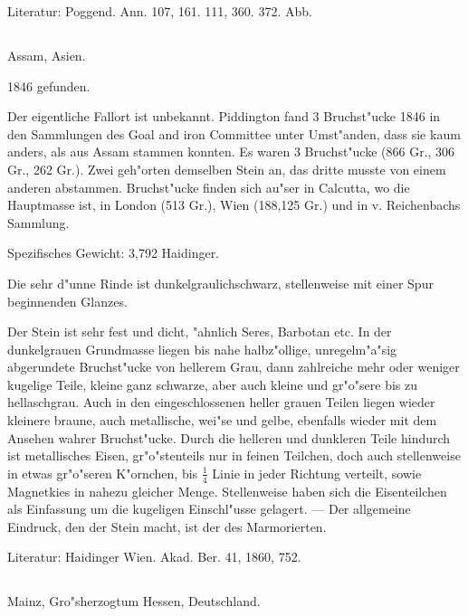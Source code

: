 \documentclass[a4paper, 11pt, oneside]{article}
\begin{document}
\normalsize
Literatur: Poggend. Ann. 107, 161. 111, 360. 372. Abb.

\subsection{}
\LARGE
\paragraph{}
Assam, Asien.

1846 gefunden.

Der eigentliche Fallort ist unbekannt. Piddington fand 3 Bruchst"ucke 1846 in den Sammlungen des Goal and iron Committee unter Umst"anden, dass sie kaum anders, als aus Assam stammen konnten. Es waren 3 Bruchst"ucke (866 Gr., 306 Gr., 262 Gr.). Zwei geh"orten demselben Stein an, das dritte musste von einem anderen abstammen. Bruchst"ucke finden sich au"ser in Calcutta, wo die Hauptmasse ist, in London (513 Gr.), Wien (188,125 Gr.) und in v. Reichenbachs Sammlung.

Spezifisches Gewicht: 3,792 Haidinger.

Die sehr d"unne Rinde ist dunkelgraulichschwarz, stellenweise mit einer Spur beginnenden Glanzes.

Der Stein ist sehr fest und dicht, "ahnlich Seres, Barbotan etc. In der dunkelgrauen Grundmasse liegen bis nahe halbz"ollige, unregelm"a"sig abgerundete Bruchst"ucke von hellerem Grau, dann zahlreiche mehr oder weniger kugelige Teile, kleine ganz schwarze, aber auch kleine und gr"o"sere bis zu hellaschgrau. Auch in den eingeschlossenen heller grauen Teilen liegen wieder kleinere braune, auch metallische, wei"se und gelbe, ebenfalls wieder mit dem Ansehen wahrer Bruchst"ucke. Durch die helleren und dunkleren Teile hindurch ist metallisches Eisen, gr"o"stenteils nur in feinen Teilchen, doch auch stellenweise in etwas gr"o"seren K"ornchen, bis $\mathfrak{\frac{1}{4}}$ Linie in jeder Richtung verteilt, sowie Magnetkies in nahezu gleicher Menge. Stellenweise haben sich die Eisenteilchen als Einfassung um die kugeligen Einschl"usse gelagert. --- Der allgemeine Eindruck, den der Stein macht, ist der des Marmorierten.

\normalsize
Literatur: Haidinger Wien. Akad. Ber. 41, 1860, 752.

\subsection{}
\LARGE
\paragraph{}
Mainz, Gro"sherzogtum Hessen, Deutschland.
\end{document}

